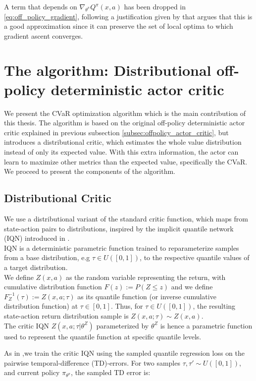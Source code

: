 A term that depends on $\nabla_{\theta^\pi} Q^{\pi}(x,a)$ has been 
dropped in \ref{eq:off_policy_gradient}, following a justification
given by \cite{Degris2012} that argues that this is a good approximation since it can
preserve the set of local optima to which gradient ascent converges.


\section{The algorithm: Distributional off-policy deterministic actor critic} \label{sec:distr_ddpg}
We present the CVaR optimization algorithm which is the main contribution of this thesis.
The algorithm is based on the original off-policy deterministic actor critic explained
in previous subsection \ref{subsec:offpolicy_actor_critic}, but introduces a distributional
critic, which estimates the whole value distribution instead of only its expected value.
With this extra information, the actor can learn to maximize other metrics than the expected value,
specifically the CVaR.
We proceed to present the components of the algorithm.


\subsection{Distributional Critic}
We use a distributional variant of the standard critic function,
which maps from state-action pairs to distributions, inspired by the implicit quantile network (IQN) introduced in \cite{Dabney2018b}.\\
IQN is a deterministic parametric function trained to reparameterize samples from a
base distribution, e.g $\tau \in U([0,1])$, to the respective
quantile values of a target distribution.\\
We define $Z(x,a)$ as the random variable representing the return, with cumulative 
distribution function $F(z):=P(Z\leq z)$ and we define $F^{-1}_Z(\tau):=Z(x,a;\tau)$ as its quantile function 
(or inverse cumulative distribution function)
at $\tau \in [0,1]$.
Thus, for $\tau \in U([0,1])$, the resulting state-action return distribution sample is
$Z(x,a;\tau)\sim Z(x,a)$.\\
The critic IQN $Z(x,a;\tau| \theta^Z)$ parameterized by $\theta^Z$  is hence a parametric function
used to represent the quantile function at specific quantile levels.

As in \citet{Dabney2018b},we train the critic IQN using the sampled quantile regression
loss \citep{koenker2005} on the pairwise temporal-difference (TD)-errors.
For two samples $\tau, \tau' \sim U([0,1])$, and current policy $\pi_{\theta^\pi}$, the sampled
TD error is:

